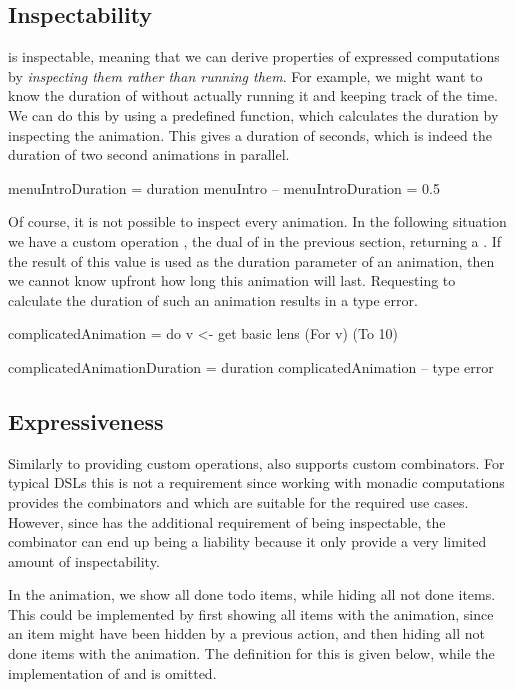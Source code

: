 \subsection{Inspectability}

\dsl{} is inspectable, meaning that we can derive properties of expressed computations by \emph{inspecting them rather than running them}. For example, we might want to know the duration of  without actually running it and keeping track of the time. We can do this by using a predefined  function, which calculates the duration by inspecting the animation. This gives a duration of  seconds, which is indeed the duration of two  second animations in parallel.

\begin{spec}
menuIntroDuration = duration menuIntro
-- menuIntroDuration = 0.5 
\end{spec}

Of course, it is not possible to inspect every animation. In the following situation we have a custom operation , the dual of  in the previous section, returning a . If the result of this value is used as the duration parameter of an animation, then we cannot know upfront how long this animation will last. Requesting to calculate the duration of such an animation results in a type error.

\begin{spec}
complicatedAnimation = do
  v <- get
  basic lens (For v) (To 10)

complicatedAnimationDuration = duration complicatedAnimation
-- type error
\end{spec}

\subsection{Expressiveness}
\label{sec:customcomb}

Similarly to providing custom operations, \dsl{} also supports custom combinators. For typical DSLs this is not a requirement since working with monadic computations provides the combinators \hs{>>=} and  which are suitable for the required use cases. However, since \dsl{} has the additional requirement of being inspectable, the \hs{>>=} combinator can end up being a liability because it only provide a very limited amount of inspectability.

In the  animation, we show all done todo items, while hiding all not done items. This could be implemented by first showing all items with the  animation, since an item might have been hidden by a previous action, and then hiding all not done items with the  animation. The definition for this is given below, while the implementation of  and  is omitted.

